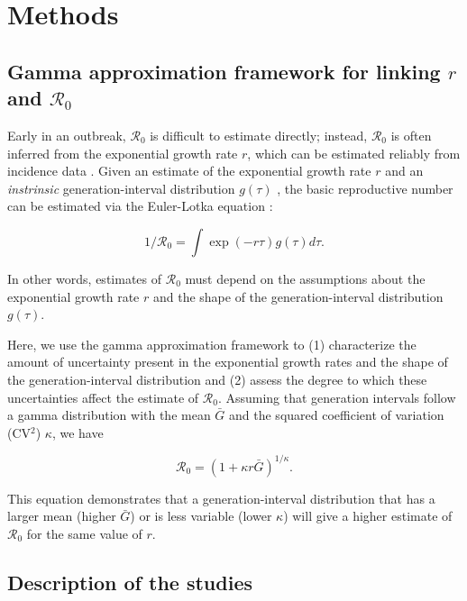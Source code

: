 \documentclass[12pt]{article}
\newcommand{\Rx}[1]{\ensuremath{{\mathcal R}_{#1}}}
\newcommand{\Ro}{\Rx{0}\xspace}
\begin{document}
\section{Methods}

\subsection{Gamma approximation framework for linking $r$ and $\mathcal R_0$}

Early in an outbreak, \Ro is difficult to estimate directly;
instead, \Ro is often inferred from the exponential growth rate $r$, which can be estimated reliably from incidence data \citep{mills2004transmissibility, nishiura2009transmission, ma2014estimating}.
Given an estimate of the exponential growth rate $r$ and an \emph{instrinsic} generation-interval distribution $g(\tau)$ \citep{champredon2015intrinsic}, the basic reproductive
number can be estimated via the Euler-Lotka equation \citep{wallinga2007generation}:
\begin{linenomath*}
\begin{equation}
1/\mathcal R_0 = \int \exp(-r\tau) g(\tau) d\tau.
\label{eq:euler}
\end{equation}
\end{linenomath*}
In other words, estimates of \Ro must
depend on the assumptions about the
exponential growth rate $r$ and the shape of the generation-interval distribution $g(\tau)$.

Here, we use the gamma approximation framework \citep{mcbryde2009early, nishiura2009transmission, roberts2011early, park2019practical} to (1) characterize the amount of uncertainty present in the exponential growth rates and the shape of the generation-interval distribution and (2) assess the degree to which these uncertainties affect the estimate of \Ro.
Assuming that generation intervals follow a gamma distribution
with the mean $\bar G$ and the squared coefficient of variation (CV$^2$) $\kappa$, 
we have
\begin{linenomath*}
\begin{equation}
\mathcal R_0 = \left(1 + \kappa r \bar{G}\right)^{1/\kappa}.
\label{eq:gamma}
\end{equation}
\end{linenomath*}
This equation demonstrates that a generation-interval distribution
that has a larger mean (higher $\bar{G}$) or is less variable (lower $\kappa$)
will give a higher estimate of \Ro for the same value of $r$.

\subsection{Description of the studies}
\end{document}

